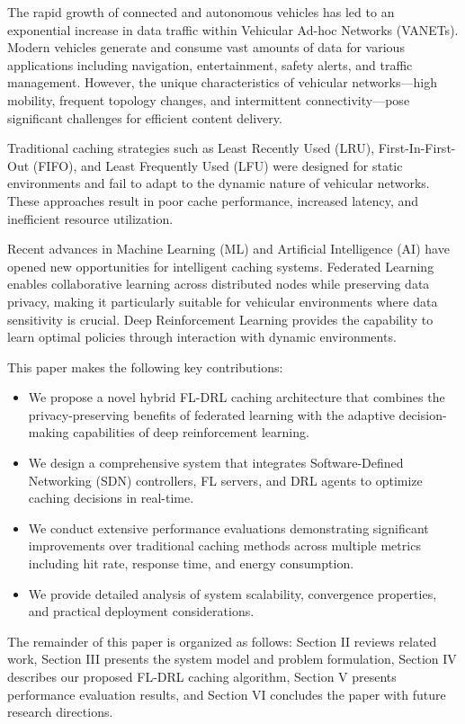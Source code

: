 \documentclass[conference]{IEEEtran}
\begin{document}
The rapid growth of connected and autonomous vehicles has led to an exponential increase in data traffic within Vehicular Ad-hoc Networks (VANETs). Modern vehicles generate and consume vast amounts of data for various applications including navigation, entertainment, safety alerts, and traffic management. However, the unique characteristics of vehicular networks—high mobility, frequent topology changes, and intermittent connectivity—pose significant challenges for efficient content delivery.

Traditional caching strategies such as Least Recently Used (LRU), First-In-First-Out (FIFO), and Least Frequently Used (LFU) were designed for static environments and fail to adapt to the dynamic nature of vehicular networks. These approaches result in poor cache performance, increased latency, and inefficient resource utilization.

Recent advances in Machine Learning (ML) and Artificial Intelligence (AI) have opened new opportunities for intelligent caching systems. Federated Learning enables collaborative learning across distributed nodes while preserving data privacy, making it particularly suitable for vehicular environments where data sensitivity is crucial. Deep Reinforcement Learning provides the capability to learn optimal policies through interaction with dynamic environments.

This paper makes the following key contributions:

\begin{itemize}
\item We propose a novel hybrid FL-DRL caching architecture that combines the privacy-preserving benefits of federated learning with the adaptive decision-making capabilities of deep reinforcement learning.
\item We design a comprehensive system that integrates Software-Defined Networking (SDN) controllers, FL servers, and DRL agents to optimize caching decisions in real-time.
\item We conduct extensive performance evaluations demonstrating significant improvements over traditional caching methods across multiple metrics including hit rate, response time, and energy consumption.
\item We provide detailed analysis of system scalability, convergence properties, and practical deployment considerations.
\end{itemize}

The remainder of this paper is organized as follows: Section II reviews related work, Section III presents the system model and problem formulation, Section IV describes our proposed FL-DRL caching algorithm, Section V presents performance evaluation results, and Section VI concludes the paper with future research directions.
\end{document}
